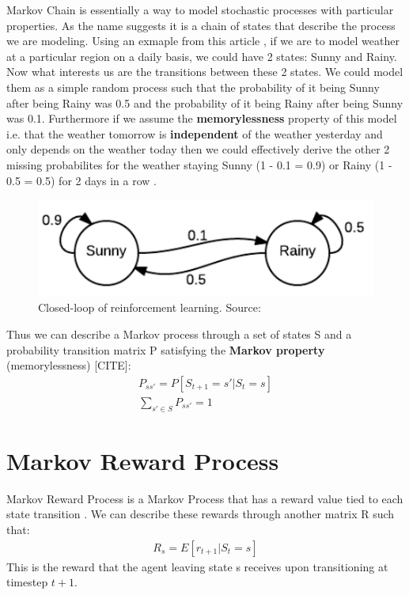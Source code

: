 Markov Chain is essentially a way to model stochastic processes with
particular properties. As the name suggests it is a chain of states
that describe the process we are modeling. Using an exmaple from this article \cite{markov_chain_article}, if we are to model weather at a particular region on a daily basis, we could have 2 states: Sunny and Rainy. Now what interests us are the transitions between these 2 states. We could model them as a simple random process such that the probability of it being Sunny after being Rainy was 0.5 and the probability of it being Rainy after being Sunny was 0.1. Furthermore if we assume the \textbf{memorylessness} property of this model i.e. that the weather tomorrow is \textbf{independent} of the weather yesterday and only depends on the weather today then we could effectively derive the other 2 missing probabilites for the weather staying Sunny (1 - 0.1 = 0.9) or Rainy (1 - 0.5 = 0.5) for 2 days in a row \cite{markov_chain_article}.

\begin{figure}[h!]
  \centering
  \includegraphics[scale=0.7]{figures/markov_weather.PNG}
  \caption{Closed-loop of reinforcement learning. Source: \cite{markov_chain_article}}
  \label{fig:weather}
\end{figure}

Thus we can describe a Markov process through a set of states S and a probability transition matrix P satisfying the \textbf{Markov property}
(memorylessness) [CITE]:
\begin{align}
    P_{ss'} = P[S_{t+1} = s' | S_{t} = s]\\
    \sum_{s' \in S} P_{ss'} = 1
\end{align}

\section{Markov Reward Process}
Markov Reward Process is a Markov Process that 
has a reward value tied to each state transition \cite{lecture_lets_go_markov}. We can describe these rewards through another matrix R such that:
\begin{align}
    R_{s} = E[r_{t+1} | S_{t} = s]
\end{align}
This is the reward that the agent leaving state s receives upon transitioning at timestep $t+1$.\\

